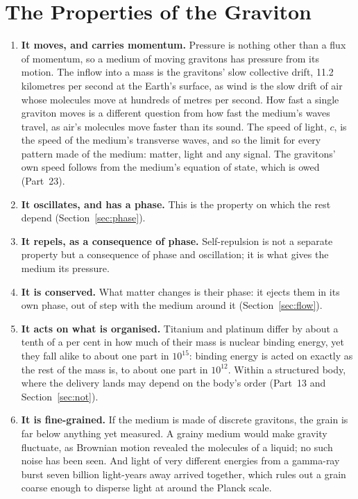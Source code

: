 \documentclass[11pt,a4paper]{article}
\begin{document}
\section{The Properties of the Graviton}
\label{sec:properties}

\begin{enumerate}
\item \textbf{It moves, and carries momentum.}  Pressure is nothing other than a flux of momentum, so a medium of moving gravitons has pressure from its motion. The inflow into a mass is the gravitons' slow collective drift, 11.2 kilometres per second at the Earth's surface, as wind is the slow drift of air whose molecules move at hundreds of metres per second. How fast a single graviton moves is a different question from how fast the medium's waves travel, as air's molecules move faster than its sound. The speed of light, $c$, is the speed of the medium's transverse waves, and so the limit for every pattern made of the medium: matter, light and any signal. The gravitons' own speed follows from the medium's equation of state, which is owed (Part~23).
\item \textbf{It oscillates, and has a phase.}  This is the property on which the rest depend (Section~\ref{sec:phase}).
\item \textbf{It repels, as a consequence of phase.}  Self-repulsion is not a separate property but a consequence of phase and oscillation; it is what gives the medium its pressure.
\item \textbf{It is conserved.}  What matter changes is their phase: it ejects them in its own phase, out of step with the medium around it (Section~\ref{sec:flow}).
\item \textbf{It acts on what is organised.}   Titanium and platinum differ by about a tenth of a per cent in how much of their mass is nuclear binding energy, yet they fall alike to about one part in $10^{15}$: binding energy is acted on exactly as the rest of the mass is, to about one part in $10^{12}$. Within a structured body, where the delivery lands may depend on the body's order (Part~13 and Section~\ref{sec:not}).
\item \textbf{It is fine-grained.} If the medium is made of discrete gravitons, the grain is far below anything yet measured. A grainy medium would make gravity fluctuate, as Brownian motion revealed the molecules of a liquid; no such noise has been seen. And light of very different energies from a gamma-ray burst seven billion light-years away arrived together, which rules out a grain coarse enough to disperse light at around the Planck scale.
\end{enumerate}
\end{document}
